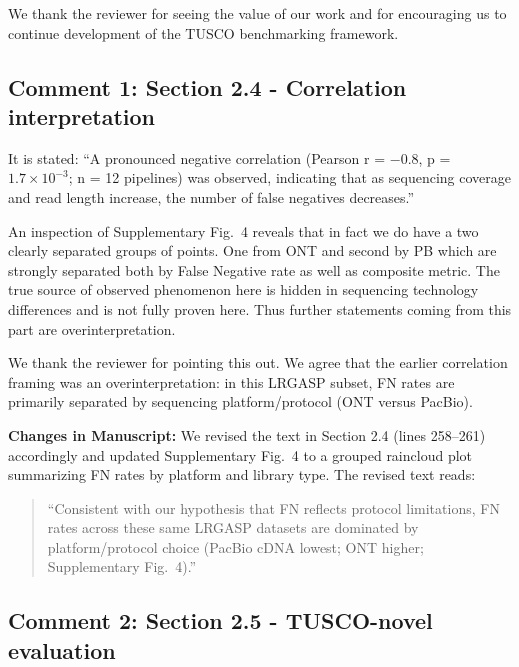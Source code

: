 \documentclass[11pt]{article}
\begin{document}
\begin{responseboxnew}
We thank the reviewer for seeing the value of our work and for encouraging us to continue development of the TUSCO benchmarking framework.
\end{responseboxnew}

\subsection{Comment 1: Section 2.4 - Correlation interpretation}

\begin{reviewercomment}
It is stated: ``A pronounced negative correlation (Pearson r = $-0.8$, p = $1.7 \times 10^{-3}$; n = 12 pipelines) was observed, indicating that as sequencing coverage and read length increase, the number of false negatives decreases.''

\vspace{0.2cm}
An inspection of Supplementary Fig.~4 reveals that in fact we do have a two clearly separated groups of points. One from ONT and second by PB which are strongly separated both by False Negative rate as well as composite metric. The true source of observed phenomenon here is hidden in sequencing technology differences and is not fully proven here. Thus further statements coming from this part are overinterpretation.
\end{reviewercomment}

\begin{responseboxnew}
We thank the reviewer for pointing this out. We agree that the earlier correlation framing was an overinterpretation: in this LRGASP subset, FN rates are primarily separated by sequencing platform/protocol (ONT versus PacBio).

\vspace{0.3cm}
\textbf{Changes in Manuscript:} We revised the text in Section 2.4 (lines 258--261) accordingly and updated Supplementary Fig.~4 to a grouped raincloud plot summarizing FN rates by platform and library type. The revised text reads:
\begin{quote}
``Consistent with our hypothesis that FN reflects protocol limitations, FN rates across these same LRGASP datasets are dominated by platform/protocol choice (PacBio cDNA lowest; ONT higher; Supplementary Fig.~4).''
\end{quote}
\end{responseboxnew}

\subsection{Comment 2: Section 2.5 - TUSCO-novel evaluation}
\end{document}
